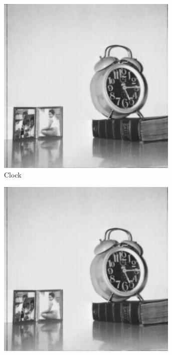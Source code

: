 \begin{figure}
\begin{subfigure}[b]{.23\textwidth}
  \centering
  \includegraphics[width=0.95\textwidth]{figures/test-images/original/clock}
  \caption{Clock}
  \label{fig:test-images-clock-original}
\end{subfigure}
\begin{subfigure}[b]{.23\textwidth}
  \centering
  \includegraphics[width=0.95\textwidth]{figures/test-images/truncate1/clock}

\end{subfigure}
\end{figure}
